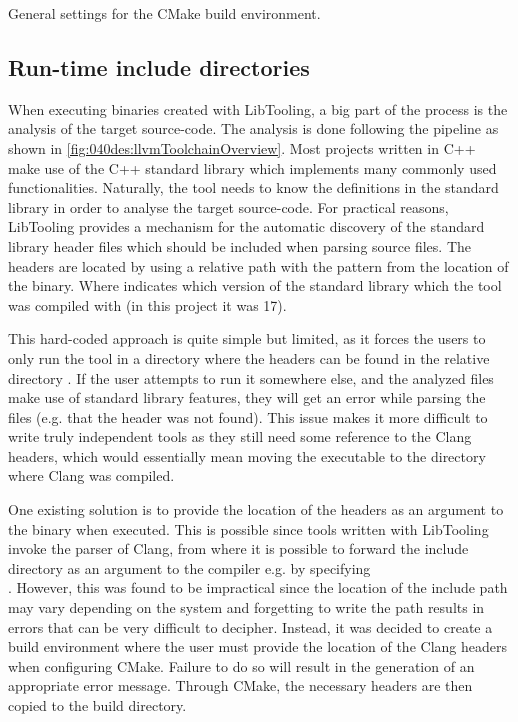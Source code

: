 \begin{listing}[H]
    \caption{General settings for the CMake build environment.}
    \label{code:080dev:cmake_base_settings}
\end{listing}

\subsection{Run-time include directories}\label{subsec:080dev:rt_include}
When executing binaries created with LibTooling, a big part of the process is the analysis of the target source-code. The analysis is done following the pipeline as shown in \cref{fig:040des:llvmToolchainOverview}. Most projects written in C++ make use of the C++ standard library which implements many commonly used functionalities. Naturally, the tool needs to know the definitions in the standard library in order to analyse the target source-code. 
For practical reasons, LibTooling provides a mechanism for the automatic discovery of the standard library header files which should be included when parsing source files. The headers are located by using a relative path with the pattern  from the location of the binary. Where  indicates which version of the standard library which the tool was compiled with (in this project it was 17).

This hard-coded approach is quite simple but limited, as it forces the users to only run the tool in a directory where the headers can be found in the relative directory .
If the user attempts to run it somewhere else, and the analyzed files make use of standard library features, they will get an error while parsing the files (e.g. that the header  was not found).
This issue makes it more difficult to write truly independent tools as they still need some reference to the Clang headers, which would essentially mean moving the executable to the directory where Clang was compiled.

One existing solution is to provide the location of the headers as an argument to the binary when executed. This is possible since tools written with LibTooling invoke the parser of Clang, from where it is possible to forward the include directory as an argument to the compiler e.g. by specifying\\.
However, this was found to be impractical since the location of the include path may vary depending on the system and forgetting to write the path results in errors that can be very difficult to decipher.
Instead, it was decided to create a build environment where the user must provide the location of the Clang headers when configuring CMake. Failure to do so will result in the generation of an appropriate error message. Through CMake, the necessary headers are then copied to the build directory.

